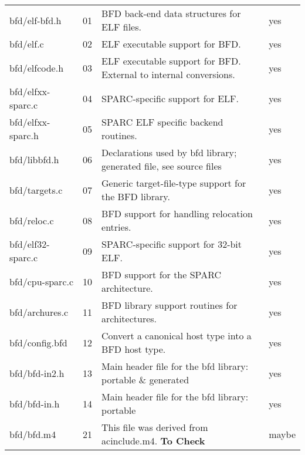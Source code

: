 \begin{table}[ht]
  \centering
  \begin{tabular}[h]{|l|c|p{.63\linewidth}|l|}
\hline
bfd/elf-bfd.h      &01&  BFD back-end data structures for ELF files.                                               & yes   \\
bfd/elf.c          &02&  ELF executable support for BFD.                                                           & yes   \\
bfd/elfcode.h      &03&  ELF executable support for BFD. External to internal conversions.                         & yes   \\
bfd/elfxx-sparc.c  &04&  SPARC-specific support for ELF.                                                           & yes   \\
bfd/elfxx-sparc.h  &05&  SPARC ELF specific backend routines.                                                      & yes   \\
bfd/libbfd.h       &06&  Declarations used by bfd library; generated file, see source files                        & yes   \\
bfd/targets.c      &07&  Generic target-file-type support for the BFD library.                                     & yes   \\
bfd/reloc.c        &08&  BFD support for handling relocation entries.                                              & yes   \\
bfd/elf32-sparc.c  &09&  SPARC-specific support for 32-bit ELF.                                                    & yes   \\
bfd/cpu-sparc.c    &10&  BFD support for the SPARC architecture.                                                   & yes   \\
bfd/archures.c     &11&  BFD library support routines for architectures.                                           & yes   \\
bfd/config.bfd     &12&  Convert a canonical host type into a BFD host type.                                       & yes   \\
bfd/bfd-in2.h      &13&  Main header file for the bfd library: portable \& generated                               & yes   \\
bfd/bfd-in.h       &14&  Main header file for the bfd library:  portable                                           & yes   \\
bfd/bfd.m4         &21&  This file was derived from acinclude.m4. \textbf{To Check}                                & maybe \\

\end{tabular}
\end{table}
